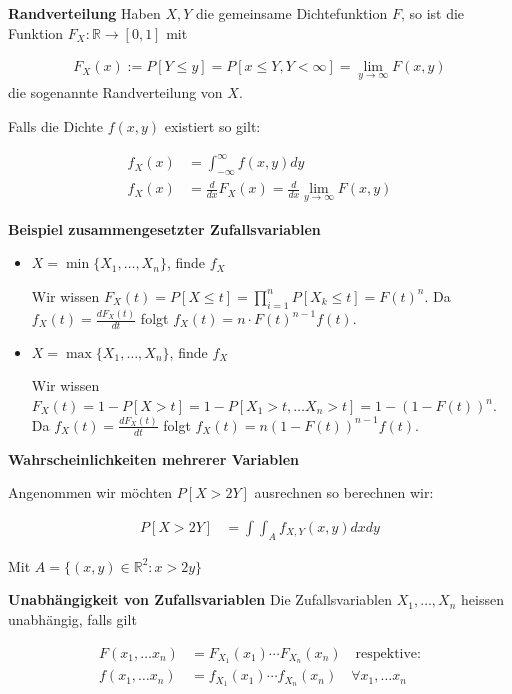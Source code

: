 \documentclass[25pt]{sciposter}
\newcommand{\R}{\mathbb{R}}
\newenvironment{method}[1]{\begin{mdframed}[backgroundcolor=blue!10,innertopmargin=15pt, innerbottommargin=15pt,nobreak=true]
		\textbf{#1 }
	}
	{ 
	\end{mdframed}
}
\newenvironment{thm}[1]{\begin{mdframed}[backgroundcolor=pink!20,innertopmargin=15pt, innerbottommargin=15pt, nobreak=true]
		\textbf{#1 }
	}
	{ 
	\end{mdframed}
}
\begin{document}
\begin{multicols}{3}
\begin{method}{Randverteilung} Haben $X,Y$ die gemeinsame Dichtefunktion $F$, so ist die Funktion $F_X : \R \to [0,1]$ mit 
	
	\begin{align*}
	F_X(x) := P[Y \leq y] = P[x\leq Y, Y < \infty] = \lim_{y \to \infty} F(x,y)
	\end{align*}
	die sogenannte Randverteilung von $X$.
	
	Falls die Dichte $f(x,y)$ existiert so gilt:
	
	\begin{align*}
	f_X(x) &= \int_{-\infty}^{\infty}f(x,y) dy\\
	f_X(x) &= \frac{d}{dx}F_X(x) = \frac{d}{dx}\lim_{y \to \infty} F(x,y)
	\end{align*}
	
\end{method}

\textbf{Beispiel zusammengesetzter Zufallsvariablen}

\begin{itemize}
	\item $X = \min\{X_1,\ldots,X_n\}$, finde $f_X$
	
	Wir wissen $F_X(t) = P[X\leq t] = \prod_{i=1}^n P[X_k \leq t] = F(t)^n$. Da $f_X(t) = \frac{dF_X(t)}{dt}$ folgt $f_X(t) = n\cdot F(t)^{n-1} f(t)$.
	
	\item $X = \max\{X_1,\ldots,X_n\}$, finde $f_X$
	
	Wir wissen $F_X(t) = 1 - P[X>t] = 1 - P [X_1 > t, \ldots X_n > t] = 1 - (1 - F(t))^n$. Da $f_X(t) = \frac{dF_X(t)}{dt}$ folgt $f_X(t) = n(1-F(t))^{n-1}f(t)$.
\end{itemize}


\begin{thm}{Wahrscheinlichkeiten mehrerer Variablen}
Angenommen wir möchten $P[X > 2Y]$ ausrechnen so berechnen wir:

\begin{align*}
	P[X>2Y] &= \int \int_A f_{X,Y} (x,y) dx dy
\end{align*}

Mit $A = \{(x,y)\in\R^2 : x > 2y\}$
\end{thm}



\begin{method}{Unabhängigkeit von Zufallsvariablen} Die Zufallsvariablen $X_1,\ldots, X_n$ heissen unabhängig, falls gilt
	
	\begin{align*}
	F(x_1,\ldots x_n) &= F_{X_1}(x_1) \cdots F_{X_n}(x_n) \quad \text{respektive:}\\
	f(x_1,\ldots x_n) &= f_{X_1}(x_1) \cdots f_{X_n}(x_n) \quad \forall x_1,\ldots x_n
	\end{align*}
\end{method}



\end{multicols}
\end{document}

